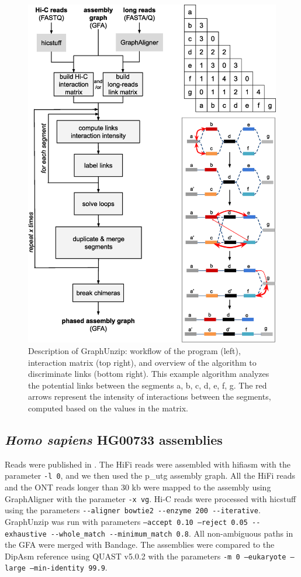 \begin{figure}
    \centering
    \includegraphics[width=16cm]{fig/graphunzip_description.eps}
    \caption{\label{principle} Description of GraphUnzip: workflow of the program (left), interaction matrix (top right), and overview of the algorithm to discriminate links (bottom right). This example algorithm analyzes the potential links between the segments a, b, c, d, e, f, g. The red arrows represent the intensity of interactions between the segments, computed based on the values in the matrix.}
\end{figure}

\subsection{\textit{Homo sapiens} HG00733 assemblies}

Reads were published in \cite{phased_human}. The HiFi reads were assembled with hifiasm with the parameter \texttt{-l 0}, and we then used the p\_utg assembly graph. All the HiFi reads and the ONT reads longer than 30 kb were mapped to the assembly using GraphAligner with the parameter \texttt{-x vg}. Hi-C reads were processed with hicstuff using the parameters \texttt{-{}-aligner bowtie2 -{}-enzyme 200 -{}-iterative}. GraphUnzip was run with parameters \texttt{--accept 0.10 --reject 0.05 -{}-exhaustive -{}-whole\_match -{}-minimum\_match 0.8}. All non-ambiguous paths in the GFA were merged with Bandage. The assemblies were compared to the DipAsm reference \cite{dipasm} using QUAST v5.0.2 \cite{quast} with the parameters \texttt{-m 0 --eukaryote --large --min-identity 99.9}.

